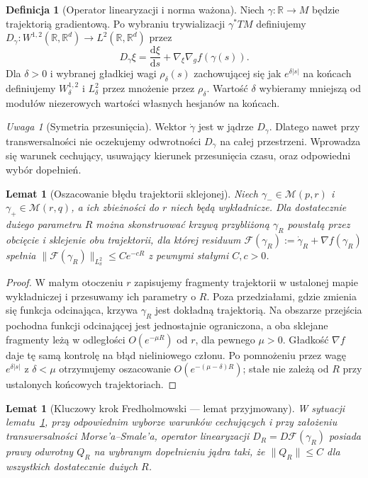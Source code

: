 \documentclass[11pt,a4paper,oneside]{report}
\newcommand{\R}{\mathbb{R}}
\newcommand{\dd}{\mathrm d}
\theoremstyle{plain}
\newtheorem{lemat}[twierdzenie]{Lemat}
\theoremstyle{definition}
\newtheorem{definicja}[twierdzenie]{Definicja}
\theoremstyle{remark}
\newtheorem{uwaga}[twierdzenie]{Uwaga}
\begin{document}
\begin{definicja}[Operator linearyzacji i norma ważona]
Niech $\gamma:\R\to M$ będzie trajektorią gradientową.
Po wybraniu trywializacji $\gamma^*TM$ definiujemy
$D_\gamma:W^{1,2}(\R,\R^d)\to L^2(\R,\R^d)$ przez
\[
D_\gamma\xi=\frac{\dd\xi}{\dd s}
+\nabla_\xi\nabla_g f(\gamma(s)).
\]
Dla $\delta>0$ i wybranej gładkiej wagi
$\rho_\delta(s)$ zachowującej się jak
$e^{\delta|s|}$ na końcach definiujemy
$W^{1,2}_\delta$ i $L^2_\delta$ przez mnożenie przez
$\rho_\delta$. Wartość $\delta$ wybieramy mniejszą od
modułów niezerowych wartości własnych hesjanów na końcach.
\end{definicja}
\begin{uwaga}[Symetria przesunięcia]
Wektor $\dot\gamma$ jest w jądrze $D_\gamma$.
Dlatego nawet przy transwersalności nie oczekujemy
odwrotności $D_\gamma$ na całej przestrzeni.
Wprowadza się warunek cechujący, usuwający kierunek
przesunięcia czasu, oraz odpowiedni wybór dopełnień.
\end{uwaga}
\begin{lemat}[Oszacowanie błędu trajektorii sklejonej]
\label{lem:xviii-preglue}
Niech $\gamma_-\in\mathcal M(p,r)$ i
$\gamma_+\in\mathcal M(r,q)$, a ich zbieżności do $r$
niech będą wykładnicze. Dla dostatecznie dużego parametru
$R$ można skonstruować krzywą przybliżoną $\gamma_R$
powstałą przez obcięcie i sklejenie obu trajektorii,
dla której residuum
$\mathcal F(\gamma_R):=\dot\gamma_R+\nabla f(\gamma_R)$
spełnia $\|\mathcal F(\gamma_R)\|_{L^2_\delta}
\le C e^{-cR}$ z pewnymi stałymi $C,c>0$.
\end{lemat}
\begin{proof}
W małym otoczeniu $r$ zapisujemy fragmenty trajektorii
w ustalonej mapie wykładniczej i przesuwamy ich parametry
o $R$. Poza przedziałami, gdzie zmienia się funkcja
odcinająca, krzywa $\gamma_R$ jest dokładną trajektorią.
Na obszarze przejścia pochodna funkcji odcinającej jest
jednostajnie ograniczona, a oba sklejane fragmenty
leżą w odległości $O(e^{-\mu R})$ od $r$, dla pewnego
$\mu>0$. Gładkość $\nabla f$ daje tę samą kontrolę
na błąd nieliniowego członu. Po pomnożeniu przez
wagę $e^{\delta|s|}$ z $\delta<\mu$ otrzymujemy
oszacowanie $O(e^{-(\mu-\delta)R})$; stałe nie zależą
od $R$ przy ustalonych końcowych trajektoriach.
\end{proof}
\begin{lemat}[Kluczowy krok Fredholmowski --- lemat przyjmowany]
\label{lem:xviii-uniform-right-inverse}
W sytuacji lematu~\ref{lem:xviii-preglue}, przy odpowiednim
wyborze warunków cechujących i przy założeniu
transwersalności Morse'a--Smale'a, operator linearyzacji
$D_R=D\mathcal F(\gamma_R)$ posiada prawy odwrotny
$Q_R$ na wybranym dopełnieniu jądra taki, że
$\|Q_R\|\le C$ dla wszystkich dostatecznie dużych $R$.
\end{lemat}
\end{document}

